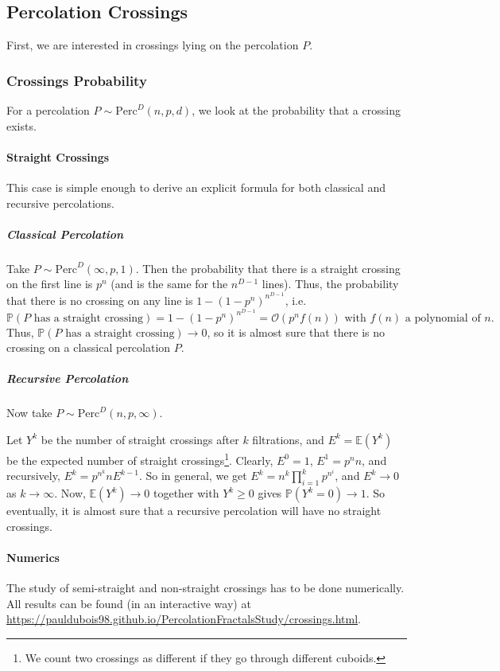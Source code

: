 \subsection{Percolation Crossings}
First, we are interested in crossings lying on the percolation $P$.

\subsubsection{Crossings Probability}
For a percolation $P \sim \text{Perc}^D(n,p,d)$, we look at the probability that a crossing exists.

\paragraph{Straight Crossings}
This case is simple enough to derive an explicit formula for both classical and recursive percolations.
\subparagraph{Classical Percolation}
Take $P \sim \text{Perc}^D(\infty,p,1)$.
Then the probability that there is a straight crossing on the first line is $p^n$ (and is the same for the $n^{D-1}$ lines).
Thus, the probability that there is no crossing on any line is $1-(1-p^n)^{n^{D-1}}$, i.e. 
$$\mathbb{P}(P \text{ has a straight crossing}) = 1-(1-p^n)^{n^{D-1}} = \mathcal{O}(p^n f(n)) \text{ with } f(n) \text{ a polynomial of } n.$$
Thus, $\mathbb{P}(P \text{ has a straight crossing}) \to 0$, so it is almost sure that there is no crossing on a classical percolation $P$.

\subparagraph{Recursive Percolation}
Now take $P \sim \text{Perc}^D(n,p,\infty)$.

Let $Y^k$ be the number of straight crossings after $k$ filtrations, and $E^k = \mathbb{E}(Y^k)$ be the expected number of straight crossings\footnote{We count two crossings as different if they go through different cuboids.}.
Clearly, $E^0 = 1$, $E^1 = p^nn$, and recursively, $E^k = p^{n^k}nE^{k-1}$.
So in general, we get $E^k = n^k \prod_{i=1}^{k} p^{n^i}$, and $E^k \to 0$ as $k \to \infty$.
Now, $\mathbb{E}(Y^k) \to 0$ together with $Y^k \geq 0$ gives $\mathbb{P}(Y^k = 0) \to 1$.
So eventually, it is almost sure that a recursive percolation will have no straight crossings.

\paragraph{Numerics}
The study of semi-straight and non-straight crossings has to be done numerically.
All results can be found (in an interactive way) at \url{https://pauldubois98.github.io/PercolationFractalsStudy/crossings.html}.


